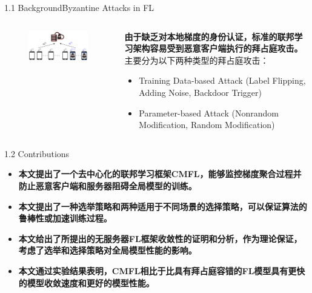 \documentclass{sintefbeamer}
\theoremstyle{definition}
\begin{document}
\begin{frame}{1.1 Background}{Byzantine Attacks in FL}
\begin{columns}
\begin{column}{0.4\textwidth}
\begin{figure}[ht]
\centering
\includegraphics[width=1\textwidth]{images/bzt_fl}
\end{figure}
\end{column}
\begin{column}{0.6\textwidth}
\textbf{由于缺乏对本地梯度的身份认证，标准的联邦学习架构容易受到恶意客户端执行的拜占庭攻击。}主要分为以下两种类型的拜占庭攻击：
\begin{itemize}
\item Training Data-based Attack (Label Flipping, Adding Noise, Backdoor Trigger)
\item Parameter-based Attack (Nonrandom Modification, Random Modification)
\end{itemize}
\end{column}
\end{columns}
\end{frame}

\begin{frame}{1.2 Contributions}
\begin{itemize}
\item \textbf{本文提出了一个去中心化的联邦学习框架CMFL，能够监控梯度聚合过程并防止恶意客户端和服务器阻碍全局模型的训练。}
\item \textbf{本文提出了一种选举策略和两种适用于不同场景的选择策略，可以保证算法的鲁棒性或加速训练过程。}
\item \textbf{本文给出了所提出的无服务器FL框架收敛性的证明和分析，作为理论保证，考虑了选举和选择策略对全局模型性能的影响。}
\item \textbf{本文通过实验结果表明，CMFL相比于比具有拜占庭容错的FL模型具有更快的模型收敛速度和更好的模型性能。}
\end{itemize}
\end{frame}
\end{document}
